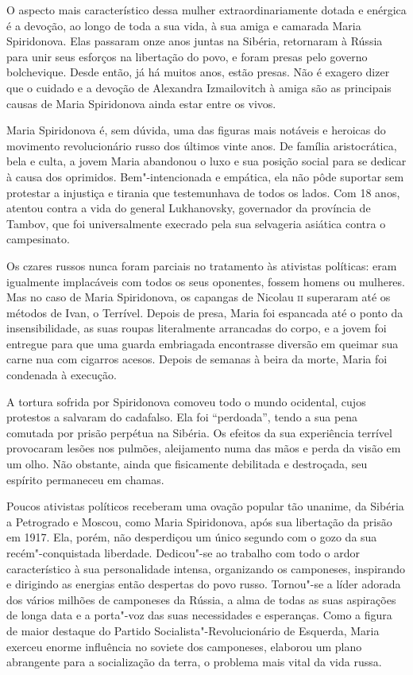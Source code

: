 O aspecto mais característico dessa mulher extraordinariamente dotada e
enérgica é a devoção, ao longo de toda a sua vida, à sua amiga e
camarada Maria Spiridonova. Elas passaram onze anos juntas na Sibéria,
retornaram à Rússia para unir seus esforços na libertação do povo, e
foram presas pelo governo bolchevique. Desde então, já há muitos anos,
estão presas. Não é exagero dizer que o cuidado e a devoção de Alexandra
Izmailovitch à amiga são as principais causas de Maria Spiridonova ainda
estar entre os vivos.

Maria Spiridonova é, sem dúvida, uma das figuras mais notáveis ​​e
heroicas do movimento revolucionário russo dos últimos vinte anos. De
família aristocrática, bela e culta, a jovem Maria abandonou o luxo e
sua posição social para se dedicar à causa dos oprimidos.
Bem"-intencionada e empática, ela não pôde suportar sem protestar a
injustiça e tirania que testemunhava de todos os lados. Com 18 anos,
atentou contra a vida do general Lukhanovsky, governador da província de
Tambov, que foi universalmente execrado pela sua selvageria asiática
contra o campesinato.

Os czares russos nunca foram parciais no tratamento às ativistas
políticas: eram igualmente implacáveis ​​com todos os seus oponentes,
fossem homens ou mulheres. Mas no caso de Maria Spiridonova, os capangas
de Nicolau \textsc{ii} superaram até os métodos de Ivan, o Terrível. Depois de
presa, Maria foi espancada até o ponto da insensibilidade, as suas roupas
literalmente arrancadas do corpo, e a jovem foi entregue para que uma guarda
embriagada encontrasse diversão em queimar sua carne nua com cigarros
acesos. Depois de semanas à beira da morte, Maria foi condenada à
execução.

A tortura sofrida por Spiridonova comoveu todo o mundo ocidental, cujos protestos
a salvaram do cadafalso. Ela foi ``perdoada'', tendo a sua pena comutada
por prisão perpétua na Sibéria. Os efeitos da sua experiência terrível
provocaram lesões nos pulmões, aleijamento numa das mãos e perda da
visão em um olho. Não obstante, ainda que fisicamente debilitada e
destroçada, seu espírito permaneceu em chamas.

Poucos ativistas políticos receberam uma ovação popular tão unanime, da
Sibéria a Petrogrado e Moscou, como Maria Spiridonova, após sua
libertação da prisão em 1917. Ela, porém, não desperdiçou um único
segundo com o gozo da sua recém"-conquistada liberdade. Dedicou"-se ao
trabalho com todo o ardor característico à sua personalidade intensa,
organizando os camponeses, inspirando e dirigindo as energias então
despertas do povo russo. Tornou"-se a líder adorada dos vários milhões de
camponeses da Rússia, a alma de todas as suas aspirações de longa data e
a porta"-voz das suas necessidades e esperanças. Como a figura de maior
destaque do Partido Socialista"-Revolucionário de Esquerda, Maria exerceu
enorme influência no soviete dos camponeses, elaborou um plano
abrangente para a socialização da terra, o problema mais vital da vida
russa.

